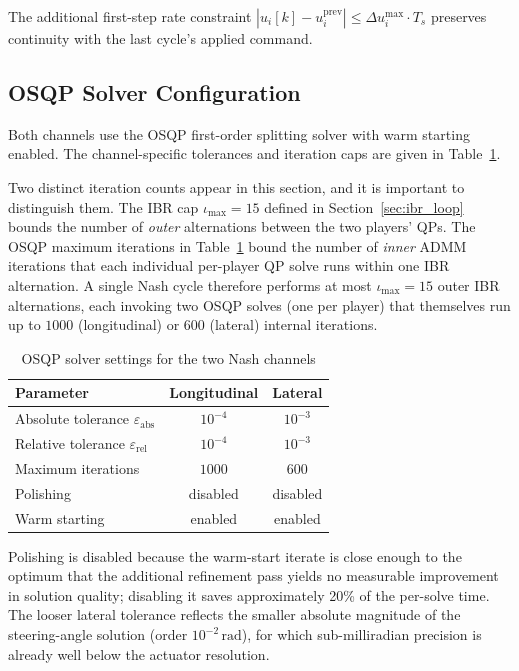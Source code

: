 \documentclass[12pt,a4paper,oneside]{report}
\begin{document}
The additional first-step rate constraint $|u_i[k] - u_i^{\text{prev}}| \leq \Delta u_i^{\max} \cdot T_s$ preserves continuity with the last cycle's applied command.

\subsection{OSQP Solver Configuration}
\label{sec:osqp_config}

Both channels use the OSQP first-order splitting solver with warm starting enabled. The channel-specific tolerances and iteration caps are given in Table~\ref{tab:osqp_settings}.

Two distinct iteration counts appear in this section, and it is important to distinguish them. The IBR cap $\iota_{\max} = 15$ defined in Section~\ref{sec:ibr_loop} bounds the number of \emph{outer} alternations between the two players' QPs. The OSQP maximum iterations in Table~\ref{tab:osqp_settings} bound the number of \emph{inner} ADMM iterations that each individual per-player QP solve runs within one IBR alternation. A single Nash cycle therefore performs at most $\iota_{\max} = 15$ outer IBR alternations, each invoking two OSQP solves (one per player) that themselves run up to $1000$ (longitudinal) or $600$ (lateral) internal iterations.

\begin{table}[ht]
\centering
\begin{tabular}{|l|c|c|}
\hline
\textbf{Parameter} & \textbf{Longitudinal} & \textbf{Lateral} \\
\hline
Absolute tolerance $\varepsilon_{\text{abs}}$ & $10^{-4}$ & $10^{-3}$ \\
Relative tolerance $\varepsilon_{\text{rel}}$ & $10^{-4}$ & $10^{-3}$ \\
Maximum iterations & $1000$ & $600$ \\
Polishing & disabled & disabled \\
Warm starting & enabled & enabled \\
\hline
\end{tabular}
\caption{OSQP solver settings for the two Nash channels}
\label{tab:osqp_settings}
\end{table}

Polishing is disabled because the warm-start iterate is close enough to the optimum that the additional refinement pass yields no measurable improvement in solution quality; disabling it saves approximately 20\% of the per-solve time. The looser lateral tolerance reflects the smaller absolute magnitude of the steering-angle solution (order $10^{-2}\,\mathrm{rad}$), for which sub-milliradian precision is already well below the actuator resolution.
\end{document}
